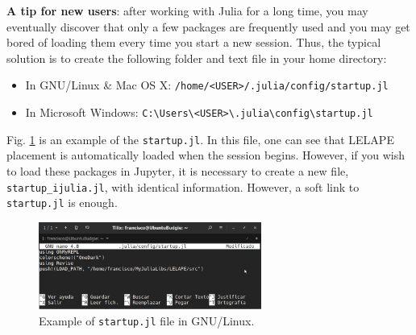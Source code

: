 \textbf{A tip for new users}: after working with Julia for a long time, you may eventually discover that only a few packages are frequently used and  you may get bored of loading them every time you start a new session. Thus, the typical solution is to create the following folder and text file in your home directory:
%
\begin{itemize}
	\item In GNU/Linux \& Mac OS X: \texttt{/home/<USER>/.julia/config/startup.jl}
	\item In Microsoft Windows: \texttt{C:{\textbackslash}Users{\textbackslash}<USER>{\textbackslash}.julia{\textbackslash}config{\textbackslash}startup.jl}
\end{itemize}  
%
Fig. \ref{Fig:startup.jl} is an example of the \texttt{startup.jl}. In this file, one can see that LELAPE placement is automatically loaded when the session begins. However, if you wish to load these packages in Jupyter, it is necessary to create a new file, \texttt{startup\_ijulia.jl}, with identical information. However, a soft link to \texttt{startup.jl} is enough.
%
\begin{figure}
	\centering
	\includegraphics[width=0.65\textwidth]{fig/startup.jl}
	\caption{Example of \texttt{startup.jl} file in GNU/Linux.}
	\label{Fig:startup.jl}
\end{figure} 